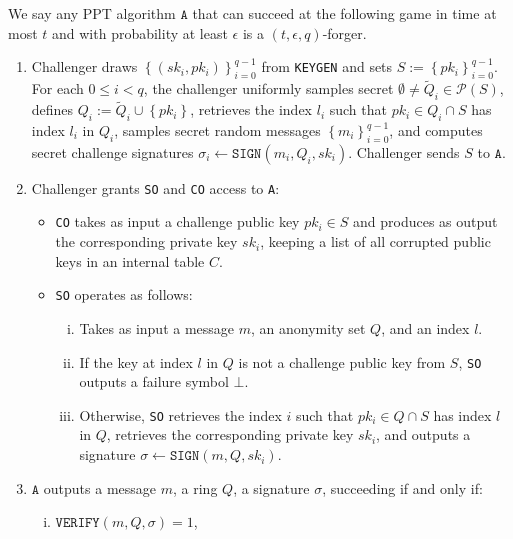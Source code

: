 \documentclass{llncs}
\begin{document}
\begin{definition}\label{def:ex-unf}
We say any PPT algorithm $\texttt{A}$ that can succeed at the following game in time at most $t$ and with probability at least $\epsilon$ is a $(t, \epsilon, q)$-forger.
\begin{enumerate}

\item Challenger draws $\left\{(sk_i, pk_i)\right\}_{i=0}^{q-1}$ from \texttt{KEYGEN} and sets $S := \left\{pk_i\right\}_{i=0}^{q-1}$. For each $0 \leq i < q$, the challenger uniformly samples secret $\emptyset \neq \widetilde{Q}_i \in \mathcal{P}\left(S\right)$, defines $Q_i := \widetilde{Q}_i \cup \left\{pk_i\right\}$, retrieves the index $l_i$ such that $pk_{i} \in Q_i \cap S$ has index $l_i$ in $Q_i$, samples secret random messages $\left\{m_i\right\}_{i=0}^{q-1}$, and computes secret challenge signatures $\sigma_i \leftarrow \texttt{SIGN}(m_i, Q_i, sk_i)$.  Challenger sends $S$ to $\texttt{A}$.
\item Challenger grants \texttt{SO} and \texttt{CO} access to \texttt{A}:
    \begin{itemize}
    \item \texttt{CO} takes as input a challenge public key $pk_i \in S$ and produces as output the corresponding private key $sk_i$, keeping a list of all corrupted public keys in an internal table $C$.

    \item \texttt{SO} operates as follows:
        \begin{enumerate}[(i)]
        \item Takes as input a message $m$, an anonymity set $Q$, and an index $l$.

        \item If the key at index $l$ in $Q$ is not a challenge public key from $S$, \texttt{SO} outputs a failure symbol $\bot$.

        \item Otherwise, \texttt{SO} retrieves the index $i$ such that $pk_{i} \in Q \cap S$ has index $l$ in $Q$, retrieves the corresponding private key $sk_{i}$, and outputs a signature $\sigma \leftarrow \texttt{SIGN}(m, Q, sk_{i})$.
        \end{enumerate}
    \end{itemize}

\item $\texttt{A}$ outputs a message $m$, a ring $Q$, a signature $\sigma$, succeeding if and only if:
    \begin{enumerate}[(i)]
    \item $\texttt{VERIFY}(m, Q, \sigma) = 1$,


\end{enumerate}
\end{enumerate}
\end{definition}
\end{document}
